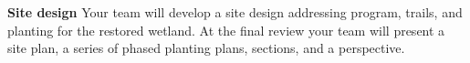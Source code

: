 \documentclass[11pt,article,oneside]{memoir}
\begin{document}
\noindent \textbf{Site design}
Your team will develop a site design
addressing program, trails, and planting
for the restored wetland.
At the final review your team will present
a site plan, a series of phased planting plans,
sections, and a perspective.
\\


%
%
%
%
\end{document}
